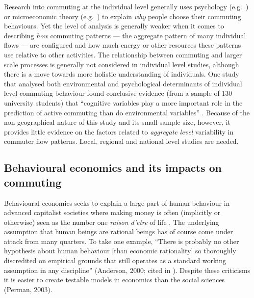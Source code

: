 Research into commuting at the individual level generally uses psychology
(e.g.~\citealp{van1998social}) or microeconomic theory (e.g.~\citealp{van1999job}) to explain
\emph{why} people choose their commuting behaviours.
Yet the level of analysis is generally weaker when it comes to describing
\emph{how} commuting patterns --- the aggregate pattern of many individual flows ---
are configured and how much energy or other resources these patterns
use relative to other activities.
The relationship between commuting and larger scale processes
is generally not considered in individual level studies, although
there is a move towards more holistic understanding of individuals.
One study that analysed both environmental and psychological
determinants of individual level commuting behaviour found conclusive evidence
(from a sample of 130 university students) that ``cognitive variables play
a more important role in the prediction of active commuting than do environmental
variables'' \citep[p.~9]{Lemieux2009}. Because of the non-geographical nature
of this study and its small sample size, however, it provides little evidence
on the factors related to \emph{aggregate level} variability in commuter flow
patterns. Local, regional and national level studies are needed.

\subsection{Behavioural economics and its impacts on commuting}
Behavioural economics seeks to explain a large part of human behaviour in advanced
capitalist societies where making money is often (implicitly or otherwise) seen
as the number one \emph{raison d'etre} of life \citep{Eisenstein2011}.
The underlying assumption that human beings are rational beings
has of course come under attack from many quarters. To take one 
example, ``There is probably no other hypothesis about human behaviour [than
economic rationality] so thoroughly discredited on empirical grounds that still
operates as a standard working assumption in any discipline''
(Anderson, 2000; cited in \citealp[p.~34]{Exel2011-b-ec}). 
Despite these criticisms it is easier to create testable models in economics 
than the social sciences (Perman, 2003).

